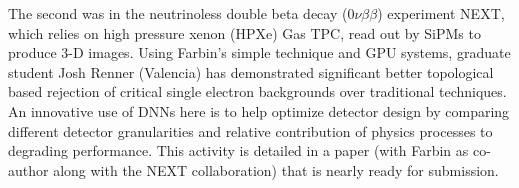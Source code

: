 The second was in the neutrinoless double beta decay ($0\nu\beta\beta$)
experiment NEXT, which relies on high pressure xenon (HPXe) Gas TPC,
read out by SiPMs to produce 3-D images. Using Farbin's simple
technique and GPU systems, graduate student Josh Renner (Valencia) has
demonstrated significant better topological based rejection of
critical single electron backgrounds over traditional techniques. An
innovative use of DNNs here is to help optimize detector design by
comparing different detector granularities and relative contribution
of physics processes to degrading performance. This activity is
detailed in a paper (with Farbin as co-author along with the NEXT
collaboration) that is nearly ready for submission.









